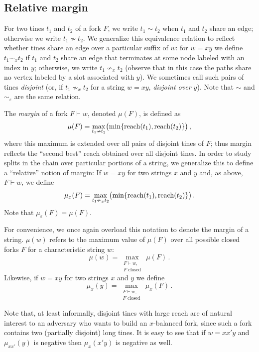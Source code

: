 \subsection{Relative margin}
\begin{definition}
  For two tines $t_1$ and $t_2$ of a fork $F$, we write $t_1 \sim t_2$
  when $t_1$ and $t_2$ share an edge; otherwise we write
  $t_1 \nsim t_2$. We generalize this equivalence relation to reflect
  whether tines share an edge over a particular suffix of $w$: for
  $w = xy$ we define $t_1 \sim_x t_2$ if $t_1$ and $t_2$ share an edge
  that terminates at some node labeled with an index in $y$;
  otherwise, we write $t_1 \nsim_x t_2$ (observe that in this case the
  paths share no vertex labeled by a slot associated with $y$).  We
  sometimes call such pairs of tines \emph{disjoint} (or, if
  $t_1 \nsim_x t_2$ for a string $w = xy$, \emph{disjoint over
    $y$}). Note that $\sim$ and $\sim_\varepsilon$ are the same
  relation.
\end{definition}

\begin{definition}[Margin]\label{def:margin}
The \emph{margin} of a fork $F\vdash w$, denoted $\mu(F)$, is defined as 
\begin{equation}\label{eq:margin-absolute}
\mu(F)=\underset{t_1\nsim t_2}\max \bigl(\min\{\operatorname{reach}(t_1),\operatorname{reach}(t_2)\}\bigr)\,,
\end{equation}
where this maximum is extended over all pairs of disjoint tines of
$F$; thus margin reflects the ``second best'' reach obtained over all
disjoint tines. In order to study splits in the chain over particular portions of a
string, we generalize this to define a ``relative'' notion of margin:
If $w = xy$ for two strings $x$ and $y$ and, as above, $F \vdash w$,
we define
\[
  \mu_x(F)=\underset{t_1\nsim_x t_2}\max \bigl(\min\{\operatorname{reach}(t_1),\operatorname{reach}(t_2)\}\bigr)\,.
\]
Note that $\mu_\varepsilon(F) = \mu(F)$.

For convenience, we once again overload this notation to denote the
margin of a string. $\mu(w)$ refers to the maximum value of $\mu(F)$
over all possible closed forks $F$ for a characteristic string $w$:
\[
\mu(w)=\underset{\substack{F\vdash w,\\ \text{$F$ closed}}}\max \, \mu(F)\,.
\]
Likewise, if $w = xy$ for two strings $x$ and $y$ we define
\[
\mu_x(y)=\underset{\substack{F\vdash w,\\ \text{$F$ closed}}} \max \, \mu_x(F)\,.
\]
\end{definition}
Note that, at least informally, 
disjoint tines with large reach are of natural
interest to an adversary who wants to build an $x$-balanced fork, 
since such a fork contains two (partially disjoint) long tines.
It is easy to see that 
if $w = xx'y$ and 
$\mu_{xx'}(y)$ is negative then $\mu_x(x'y)$ is negative as well.

